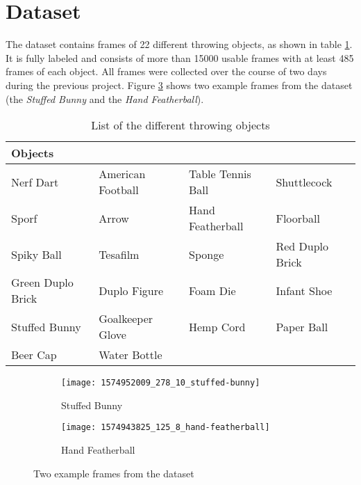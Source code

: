 \section{Dataset} %
\label{sec:training_of_the_cnn:dataset}

The dataset contains frames of 22 different throwing objects, as shown in table \ref{tab:objects}.
It is fully labeled and consists of more than \num{15000} usable frames with at least \num{485} frames of each object.
All frames were collected over the course of two days during the previous project.
Figure \ref{fig:dataset} shows two example frames from the dataset (the \textit{Stuffed Bunny} and the \textit{Hand Featherball}).

\begin{table}
  \caption{List of the different throwing objects}
  \label{tab:objects}
  \centering
  \begin{tabular}{llll}
    \toprule
    \textbf{Objects} &  &  &  \\
    \midrule
    Nerf Dart & American Football & Table Tennis Ball & Shuttlecock \\ %
    Sporf & Arrow & Hand Featherball & Floorball \\
    Spiky Ball & Tesafilm & Sponge & Red Duplo Brick \\
    Green Duplo Brick & Duplo Figure & Foam Die & Infant Shoe \\
    Stuffed Bunny & Goalkeeper Glove & Hemp Cord & Paper Ball \\
    Beer Cap & Water Bottle &  &  \\
    \bottomrule
  \end{tabular}
\end{table}

\begin{figure}[t]
  \centering
  \begin{subfigure}[b]{0.45\textwidth}
    \centering
    \texttt{[image: 1574952009\_278\_10\_stuffed-bunny]}
    \caption{Stuffed Bunny}
    \label{subfig:dataset_stuffed_bunny}
  \end{subfigure}
  \begin{subfigure}[b]{0.45\textwidth}
    \centering
    \texttt{[image: 1574943825\_125\_8\_hand-featherball]}
    \caption{Hand Featherball}
    \label{subfig:dataset_hand_featherball}
  \end{subfigure}
  \caption{Two example frames from the dataset}
  \label{fig:dataset}
\end{figure}





